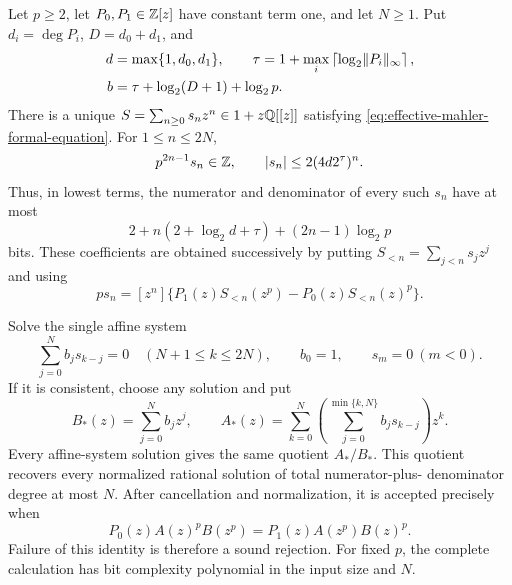 \begin{lemma}
\label{rem:effective-rational-mahler-complexity}
Let \(p\ge2\), let \(P_0,P_1\in\mathbb{Z}[z]\) have constant term one, and let
\(N\ge1\).  Put \(d_i=\deg P_i\), \(D=d_0+d_1\), and
\[
 \begin{split}
 d&=\max\{1,d_0,d_1\},\qquad
 \tau=1+\max_i\left\lceil\log_2\lVert P_i \rVert_\infty\right\rceil,\\
 b&=\tau+\log_2(D+1)+\log_2p.
 \end{split}
\]
There is a unique \(S=\sum_{n\ge0}s_nz^n\in1+z\mathbb{Q}[[z]]\) satisfying
\eqref{eq:effective-mahler-formal-equation}.  For \(1\le n\le2N\),
\begin{equation}\label{eq:effective-mahler-coefficient-arithmetic}
 p^{2n-1}s_n\in\mathbb{Z},\qquad
 \lvert s_n \rvert\le2(4d2^\tau)^n.
\end{equation}
Thus, in lowest terms, the numerator and denominator of every such \(s_n\)
have at most
\begin{equation}\label{eq:effective-mahler-coefficient-bit-bound}
 2+n(2+\log_2d+\tau)+(2n-1)\log_2p
\end{equation}
bits.  These coefficients are obtained successively by putting
\(S_{<n}=\sum_{j<n}s_jz^j\) and using
\begin{equation}\label{eq:effective-mahler-coefficient-recurrence}
 ps_n=[z^n]\{P_1(z)S_{<n}(z^p)-P_0(z)S_{<n}(z)^p\}.
\end{equation}

Solve the single affine system
\begin{equation}\label{eq:effective-mahler-pade-system}
 \sum_{j=0}^N b_js_{k-j}=0\quad(N+1\le k\le2N),
 \qquad b_0=1,\qquad s_m=0\ (m<0).
\end{equation}
If it is consistent, choose any solution and put
\[
 B_*(z)=\sum_{j=0}^Nb_jz^j,\qquad
 A_*(z)=\sum_{k=0}^N\left(\sum_{j=0}^{\min\{k,N\}}b_js_{k-j}\right)z^k.
\]
Every affine-system solution gives the same quotient \(A_*/B_*\).  This
quotient recovers every normalized rational solution of total numerator-plus-
denominator degree at most \(N\).  After cancellation and normalization, it
is accepted precisely when
\begin{equation}\label{eq:effective-mahler-final-identity}
 P_0(z)A(z)^pB(z^p)=P_1(z)A(z^p)B(z)^p.
\end{equation}
Failure of this identity is therefore a sound rejection.  For fixed \(p\),
the complete calculation has bit complexity polynomial in the input size and
\(N\).
\end{lemma}


